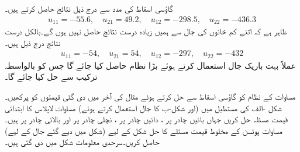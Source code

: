 گاؤسی اسقاط کی مدد سے درج ذیل نتائج حاصل کرتے ہیں۔
\begin{align*}
u_{11}=-55.6,\quad u_{21}=49.2,\quad u_{12}=-298.5,\quad u_{22}=-436.3
\end{align*}
ظاہر ہے کہ اتنے کم خانوں کی جال سے ہمیں زیادہ درست نتائج حاصل نہیں ہوں گے۔بالکل درست نتائج درج ذیل ہیں۔
\begin{align*}
u_{11}=-54,\quad u_{21}=54,\quad u_{12}=-297,\quad u_{22}=-432
\end{align*}
عملاً بہت باریک جال استعمال کرتے ہوئے بڑا نظام حاصل کیا جائے گا جس کو بالواسطہ ترکیب سے حل کیا جائے گا۔

\quad 
مساوات  کے نظام کو گاؤسی اسقاط سے حل کرتے ہوئے مثال  کی آخر میں دی گئی قیمتوں کو پرکھیں۔
\quad
شکل -الف کی مستطیل میں  (اور شکل-ب کا جال استعمال کرتے ہوئے) مساوات لاپلاس  کا ابتدائی قیمت مسئلہ حل کریں جہاں بائیں چادر پر ، دائیں چادر پر ، نچلی چادر پر  اور بالائی چادر پر  ہیں۔
\quad
مساوات پوئسن  کے مخلوط قیمت مسئلے کا حل شکل  کے لیے  (شکل میں دیے گئے جال کے لیے) حاصل کریں۔سرحدی معلومات شکل میں دی گئی ہیں۔
